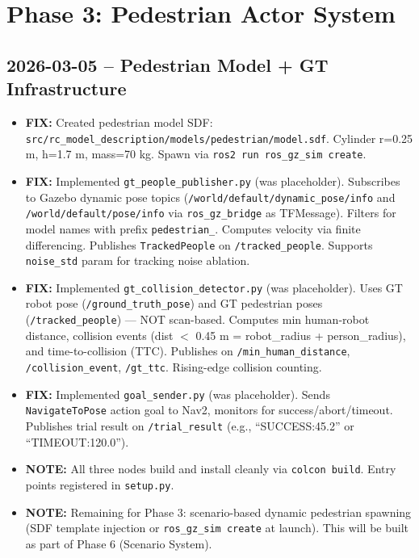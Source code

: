 \documentclass[11pt]{article}
\newcommand{\logentry}[1]{\subsection*{#1}}
\newcommand{\fix}[1]{\textcolor{fixgreen}{\textbf{FIX:} #1}}
\newcommand{\note}[1]{\textcolor{notblue}{\textbf{NOTE:} #1}}
\begin{document}
\newpage
\section{Phase 3: Pedestrian Actor System}

\logentry{2026-03-05 -- Pedestrian Model + GT Infrastructure}
\begin{itemize}
  \item \fix{Created pedestrian model SDF: \texttt{src/rc\_model\_description/models/pedestrian/model.sdf}. Cylinder r=0.25 m, h=1.7 m, mass=70 kg. Spawn via \texttt{ros2 run ros\_gz\_sim create}.}
  \item \fix{Implemented \texttt{gt\_people\_publisher.py} (was placeholder). Subscribes to Gazebo dynamic pose topics (\texttt{/world/default/dynamic\_pose/info} and \texttt{/world/default/pose/info} via \texttt{ros\_gz\_bridge} as TFMessage). Filters for model names with prefix \texttt{pedestrian\_}. Computes velocity via finite differencing. Publishes \texttt{TrackedPeople} on \texttt{/tracked\_people}. Supports \texttt{noise\_std} param for tracking noise ablation.}
  \item \fix{Implemented \texttt{gt\_collision\_detector.py} (was placeholder). Uses GT robot pose (\texttt{/ground\_truth\_pose}) and GT pedestrian poses (\texttt{/tracked\_people}) --- NOT scan-based. Computes min human-robot distance, collision events (dist $<$ 0.45 m = robot\_radius + person\_radius), and time-to-collision (TTC). Publishes on \texttt{/min\_human\_distance}, \texttt{/collision\_event}, \texttt{/gt\_ttc}. Rising-edge collision counting.}
  \item \fix{Implemented \texttt{goal\_sender.py} (was placeholder). Sends \texttt{NavigateToPose} action goal to Nav2, monitors for success/abort/timeout. Publishes trial result on \texttt{/trial\_result} (e.g., ``SUCCESS:45.2'' or ``TIMEOUT:120.0'').}
  \item \note{All three nodes build and install cleanly via \texttt{colcon build}. Entry points registered in \texttt{setup.py}.}
  \item \note{Remaining for Phase 3: scenario-based dynamic pedestrian spawning (SDF template injection or \texttt{ros\_gz\_sim create} at launch). This will be built as part of Phase 6 (Scenario System).}
\end{itemize}

\newpage
\end{document}

